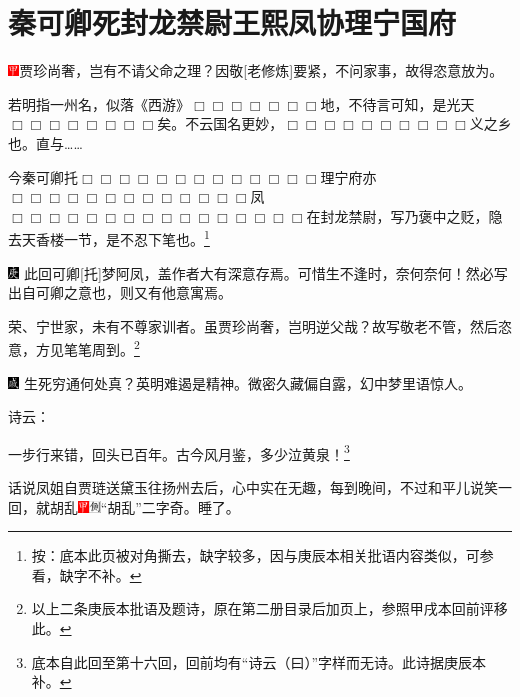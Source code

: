 

\chapter{秦可卿死封龙禁尉\hspace{.5em}王熙凤协理宁国府}

\includegraphics[width=3mm]{../Images/00002}{贾珍尚奢，岂有不请父命之理？因敬{[}老修炼{]}要紧，不问家事，故得恣意放为。}

{若明指一州名，似落《西游》{$\Box\Box\Box\Box\Box\Box\Box$}地，不待言可知，是光天{$\Box\Box\Box\Box\Box\Box\Box\Box$}矣。不云国名更妙，{$\Box\Box\Box\Box\Box\Box\Box\Box\Box\Box$}义之乡也。直与\ldots{}\ldots{}}

{今秦可卿托{$\Box\Box\Box\Box\Box\Box\Box\Box\Box\Box\Box\Box\Box$}理宁府亦{$\Box\Box\Box\Box\Box\Box\Box\Box\Box\Box\Box\Box\Box$}凤{$\Box\Box\Box\Box\Box\Box\Box\Box\Box\Box\Box\Box\Box\Box\Box\Box$}在封龙禁尉，写乃褒中之贬，隐去天香楼一节，是不忍下笔也。}\footnote{按：底本此页被对角撕去，缺字较多，因与庚辰本相关批语内容类似，可参看，缺字不补。}

{{\includegraphics[width=3mm]{../Images/00004}  \kaishu 此回可卿{[}托{]}梦阿凤，盖作者大有深意存焉。可惜生不逢时，奈何奈何！然必写出自可卿之意也，则又有他意寓焉。

荣、宁世家，未有不尊家训者。虽贾珍尚奢，岂明逆父哉？故写敬老不管，然后恣意，方见笔笔周到。\footnote{以上二条庚辰本批语及题诗，原在第二册目录后加页上，参照甲戌本回前评移此。}}}

{\includegraphics[width=3mm]{../Images/00005} \kaishu 生死穷通何处真？英明难遏是精神。微密久藏偏自露，幻中梦里语惊人。}

诗云：

一步行来错，回头已百年。古今风月鉴，多少泣黄泉！\footnote{底本自此回至第十六回，回前均有“诗云（曰）”字样而无诗。此诗据庚辰本补。}

话说凤姐自贾琏送黛玉往扬州去后，心中实在无趣，每到晚间，不过和平儿说笑一回，就胡乱{\includegraphics[width=3mm]{../Images/00002}\includegraphics[width=3mm]{../Images/00011}\footnotesize \kaishu “胡乱”二字奇。}睡了。

